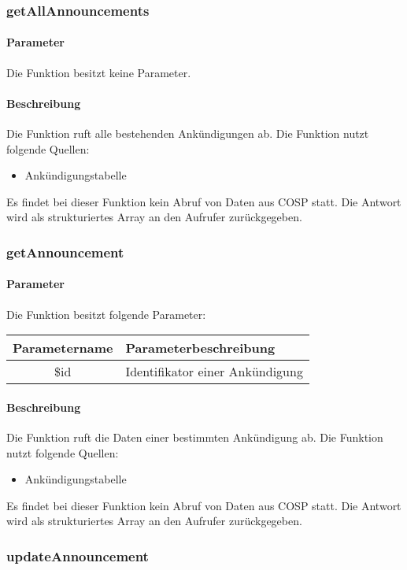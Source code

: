 \subsubsection{getAllAnnouncements}
\paragraph{Parameter} Die Funktion besitzt keine Parameter.
\paragraph{Beschreibung} Die Funktion ruft alle bestehenden Ankündigungen ab. Die Funktion nutzt folgende Quellen:
\begin{itemize}
	\item Ankündigungstabelle
\end{itemize}
Es findet bei dieser Funktion kein Abruf von Daten aus {\glqq COSP\grqq} statt. Die Antwort wird als strukturiertes Array an den Aufrufer zurückgegeben.
\subsubsection{getAnnouncement}
\paragraph{Parameter} Die Funktion besitzt folgende Parameter:
\begin{table}[H]
	\begin{tabular}{|c|p{11cm}|}
		\hline
		\textbf{Parametername} & \textbf{Parameterbeschreibung} \\ \hline
		\$id & Identifikator einer Ankündigung\\ \hline
	\end{tabular}
\end{table}
\paragraph{Beschreibung} Die Funktion ruft die Daten einer bestimmten Ankündigung ab. Die Funktion nutzt folgende Quellen:
\begin{itemize}
	\item Ankündigungstabelle
\end{itemize}
Es findet bei dieser Funktion kein Abruf von Daten aus {\glqq COSP\grqq} statt. Die Antwort wird als strukturiertes Array an den Aufrufer zurückgegeben.
\subsubsection{updateAnnouncement}
